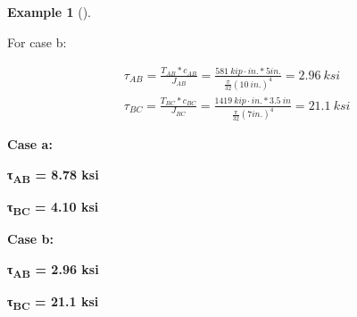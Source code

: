 \documentclass[
  letterpaper,
  DIV=11,
  numbers=noendperiod]{scrreprt}
\theoremstyle{definition}
\newtheorem{example}{Example}[chapter]
\theoremstyle{remark}
\begin{document}
\begin{tcolorbox}
\begin{example}[]
\begin{tcolorbox}
For case b:

\[
\begin{aligned}
& \tau_{AB}=\frac{T_{AB}*c_{AB}}{J_{AB}}=\frac{581{~kip}\cdot{in.}*5{in.}}{\frac{\pi}{32}(10{~in.})^4}=2.96{~ksi} \\
& \tau_{BC}=\frac{T_{BC}*c_{BC}}{J_{BC}}=\frac{1419{~kip}\cdot{in.}*3.5{~in}}{\frac{\pi}{32}(7{in.})^4}=21.1{~ksi}
\end{aligned}
\]

\textbf{Case a:}

\textbf{τ\textsubscript{AB} = 8.78 ksi}

\textbf{τ\textsubscript{BC} = 4.10 ksi}

\textbf{Case b:}

\textbf{τ\textsubscript{AB} = 2.96 ksi}

\textbf{τ\textsubscript{BC} = 21.1 ksi}

\end{tcolorbox}

\end{example}

\end{tcolorbox}
\end{document}
